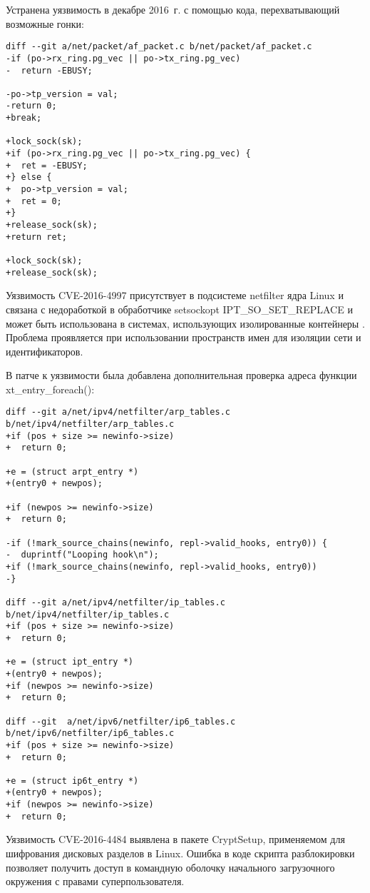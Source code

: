 Устранена уязвимость в декабре 2016~г. с помощью кода, перехватывающий возможные гонки:
\begin{lstlisting}
diff --git a/net/packet/af_packet.c b/net/packet/af_packet.c
-if (po->rx_ring.pg_vec || po->tx_ring.pg_vec)
-  return -EBUSY;

-po->tp_version = val;
-return 0;
+break;

+lock_sock(sk);
+if (po->rx_ring.pg_vec || po->tx_ring.pg_vec) {
+  ret = -EBUSY;
+} else {
+  po->tp_version = val;
+  ret = 0;
+}
+release_sock(sk);
+return ret;

+lock_sock(sk);
+release_sock(sk);
\end{lstlisting}

Уязвимость CVE-2016-4997 присутствует в подсистеме netfilter ядра Linux и связана с недоработкой в обработчике setsockopt IPT\_SO\_SET\_REPLACE и может быть использована в системах, использующих изолированные контейнеры \cite{netf}.
Проблема проявляется при использовании пространств имен для изоляции сети и идентификаторов.

В патче к уязвимости была добавлена дополнительная проверка адреса функции xt\_entry\_foreach():
\begin{lstlisting}
diff --git a/net/ipv4/netfilter/arp_tables.c b/net/ipv4/netfilter/arp_tables.c
+if (pos + size >= newinfo->size)
+  return 0;

+e = (struct arpt_entry *)
+(entry0 + newpos);

+if (newpos >= newinfo->size)
+  return 0;

-if (!mark_source_chains(newinfo, repl->valid_hooks, entry0)) {
-  duprintf("Looping hook\n");
+if (!mark_source_chains(newinfo, repl->valid_hooks, entry0))
-}

diff --git a/net/ipv4/netfilter/ip_tables.c b/net/ipv4/netfilter/ip_tables.c
+if (pos + size >= newinfo->size)
+  return 0;

+e = (struct ipt_entry *)
+(entry0 + newpos);
+if (newpos >= newinfo->size)
+  return 0;

diff --git  a/net/ipv6/netfilter/ip6_tables.c b/net/ipv6/netfilter/ip6_tables.c
+if (pos + size >= newinfo->size)
+  return 0;

+e = (struct ip6t_entry *)
+(entry0 + newpos);
+if (newpos >= newinfo->size)
+  return 0;
\end{lstlisting}

Уязвимость CVE-2016-4484 выявлена в пакете CryptSetup, применяемом для шифрования дисковых разделов в Linux.
Ошибка в коде скрипта разблокировки позволяет получить доступ в командную оболочку начального загрузочного окружения с правами суперпользователя.

